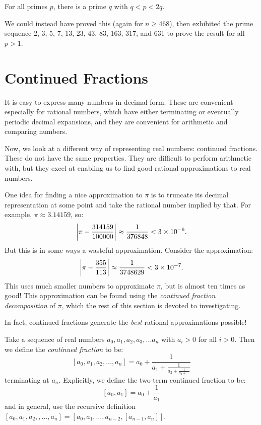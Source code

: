 \documentclass{article}
\begin{document}
\begin{corollary}
    For all primes $p$, there is a prime $q$ with $q < p < 2q$.
\end{corollary}

\begin{note}
	We could instead have proved this (again for $n \geq 468$), then exhibited the prime sequence 2, 3, 5, 7, 13, 23, 43, 83, 163, 317, and 631 to prove the result for all $p > 1$.
\end{note}


\pagebreak
\section{Continued Fractions}
\label{subsection-continued-fractions}

It is easy to express many numbers in decimal form. These are convenient especially for rational numbers, which have either terminating or eventually periodic decimal expansions, and they are convenient for arithmetic and comparing numbers.

Now, we look at a different way of representing real numbers: continued fractions. These do not have the same properties. They are difficult to perform arithmetic with, but they excel at enabling us to find good rational approximations to real numbers.

\begin{example}[Approximating $\pi$]
	\label{approximating-pi-355-113}
    One idea for finding a nice approximation to $\pi$ is to truncate its decimal representation at some point and take the rational number implied by that. For example, $\pi \approx 3.14159$, so:
    \[
	\left\lvert \pi - \frac{314159}{100000} \right\rvert \approx \frac{1}{376848} < 3 \times 10^{-6}.
	\]
	But this is in some ways a wasteful approximation. Consider the approximation:
    \[
	\left\lvert \pi - \frac{355}{113} \right\rvert \approx \frac{1}{3748629} < 3 \times 10^{-7}.
	\]
	This uses much smaller numbers to approximate $\pi$, but is almost ten times as good! This approximation can be found using the \textit{continued fraction decomposition} of $\pi$, which the rest of this section is devoted to investigating.
\end{example}

In fact, continued fractions generate the \textit{best} rational approximations possible!

\begin{definition}
	Take a sequence of real numbers $a_0, a_1, a_2, a_3, \dots a_n$ with $a_i > 0$ for all $i > 0$. Then we define the \textit{continued fraction} to be:
	\[
	[a_0, a_1, a_2, \dots, a_n] = a_0 +
	\frac{1}{a_1 + \frac{1}{a_2 + \frac{1}{a_3 + \dots }}}
	\]
	terminating at $a_n$. Explicitly, we define the two-term continued fraction to be:
	\[
	[a_0, a_1] = a_0 + \frac{1}{a_1}
	\]
	and in general, use the recursive definition $[a_0, a_1, a_2,, \dots, a_n] = [a_0, a_1, \dots, a_{n-2}, [a_{n-1}, a_n]]$.
\end{definition}
\end{document}
